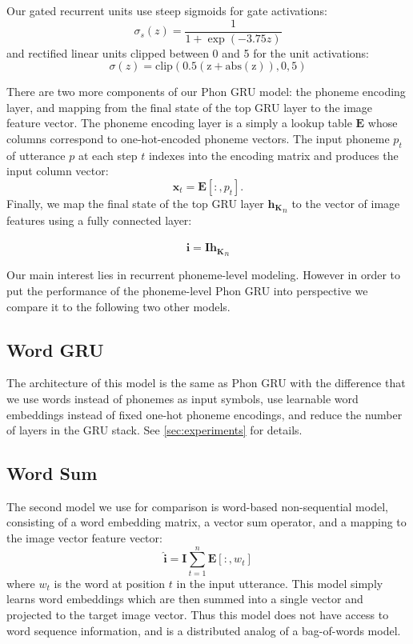 Our gated recurrent units use steep sigmoids for gate activations: \[
\sigma_s(z) = \frac{1}{1 + \exp(-3.75z)} 
\]
and rectified linear units clipped between 0 and 5 for the unit
activations:
\[
\sigma(z) = \mathrm{clip(0.5(z+\mathrm{abs}(z)), 0, 5)}
\]

There are two more components of our {\sc Phon GRU} model: the
phoneme encoding layer, and mapping from the final state of the top GRU
layer to the image feature vector.
The phoneme encoding layer is a simply a lookup table $\mathbf{E}$ whose
columns correspond to one-hot-encoded phoneme vectors. The input
phoneme $p_t$ of utterance $p$ at each step $t$ indexes into the
encoding matrix and produces the input column vector:
\begin{equation}
  \mathbf{x}_t = \mathbf{E}[:,p_t].
\end{equation}
Finally, we map the final state of the top GRU layer ${\mathbf{h_K}}_n$
to the vector of image features using a fully connected layer:

\begin{equation}
  \hat{\mathbf{i}} = \mathbf{I} {\mathbf{h_K}}_n
\end{equation}

Our main interest lies in  recurrent phoneme-level modeling. However in order to
put the performance of the phoneme-level {\sc Phon GRU} into
perspective we compare it to the following two other models.


\subsection{Word GRU}
The architecture of this model is the same as {\sc Phon GRU} with
the difference that we use words instead of phonemes as input symbols,
use learnable word embeddings instead of fixed one-hot phoneme
encodings, and reduce the number of layers in the GRU stack. See
\ref{sec:experiments} for details.
\subsection{Word Sum}
The second model we use for comparison is word-based non-sequential
model, consisting of a word embedding matrix, a vector sum operator,
and a mapping to the image vector feature vector:
\begin{equation}
  \label{eq:sum}
  \hat{\mathbf{i}} = \mathbf{I} \sum_{t=1}^n \mathbf{E}[:,w_t]
\end{equation}
where $w_t$ is the word at position $t$ in the input utterance.
This model simply learns word embeddings which are then summed into a
single vector and projected to the target image vector. Thus this model does
not have access to word sequence information, and is a distributed
analog of a bag-of-words model.
